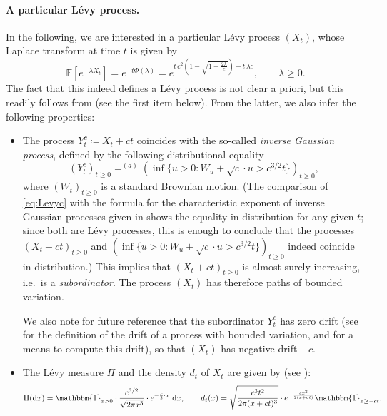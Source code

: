 \documentclass[AHL,XML,longabstracts,Unicode]{cedram}
\def\d{{\rm d}}
\newcommand\Es[1]{\mathbb{E}\left[#1\right]}
\begin{document}
\paragraph*{A particular L\'evy process.} In the following, we are interested in a particular L\'evy process $(X_t)$,
whose Laplace transform at time $t$ is given by
\begin{equation}
  \Es{e^{-\lambda X_t}}=e ^{-t \Phi(\lambda)}=e^{t \, c^{2}   \left( 1- \sqrt{1+ \frac{2 \lambda}{c} } \right) +t\, \lambda c }, \qquad \lambda \geq 0.
    \label{eq:Levyc}
\end{equation}
The fact that this indeed defines a L\'evy process is not clear a priori, but this readily follows from  \cite[Sec.1.2.5]{Kyp06}
(see the first item below).
From the latter, we also infer the following properties:
\begin{itemize}
  \item The process $Y^c_t \coloneqq X_t +ct$ coincides with the so-called \emph{inverse Gaussian process},
    defined by the following distributional equality
    \[(Y^c_t)_{t \ge 0} \mathop{=}^{(d)} \left(  \inf \{u>0 : W_{u}+\sqrt{c} \cdot u > c^{3/2} t \}  \right) _{t \geq 0},\]
    where $(W_{t})_{t \geq 0}$ is a standard Brownian motion.
    (The comparison of \eqref{eq:Levyc} with the formula for the characteristic exponent
    of inverse Gaussian processes given in \cite[Sec.1.2.5]{Kyp06} shows the equality in distribution for any given $t$;
    since both are L\'evy processes, this is enough to conclude that the processes
    $(X_t +ct)_{t \ge 0}$ and $\left(  \inf \{u>0 : W_{u}+\sqrt{c} \cdot u > c^{3/2} t \}  \right) _{t \geq 0}$
    indeed coincide in distribution.)
    This implies that $(X_t +ct)_{t \geq 0}$ is almost surely increasing, i.e.\ is a {\em subordinator}.
    The process $(X_t)$ has therefore paths of bounded variation.

We also note for future reference that the subordinator $Y^{c}_t$ has zero drift
(see \cite[Eq.~(2.21)]{Kyp06} for the definition of the drift of a process with bounded variation,
and \cite[Exercise 2.11]{Kyp06} for a means to compute this drift),
so that $(X_t)$ has negative drift $-c$.
  \item The L\'evy measure $\Pi$ and the density $d_t$ of $X_t$ are given by (see \cite[Exercice 1.6]{Kyp06}):
  \begin{equation}
  \label{eq:densiteXt}
  \Pi({\d}x)= \mathbbm{1}_{x>0} \cdot \frac{c^{3/2}}{\sqrt{2 \pi x^{3}}} \cdot e^{- \frac{c }{2} \cdot x} \ \mathrm{d}x, \qquad   d_{t}(x) =  \sqrt{ \frac{c^3 t^2}{2 \pi (x+ct)^{3}}} \cdot e^{- \frac{c x^{2}}{2(x+ct)}}  \mathbbm{1}_{x \geq -ct}.
  \end{equation}


\end{itemize}
\end{document}
